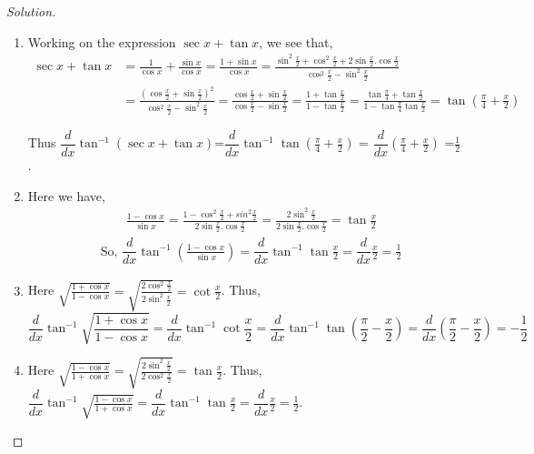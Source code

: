 \documentclass[../../main.tex]{subfiles}
\theoremstyle{definition}
\newenvironment{solution}
    {\begin{proof}[Solution]}
    {\end{proof}}
\begin{document}
\begin{solution}
\begin{enumerate}[label=(\roman*)]
\item Working on the expression $\sec x+\tan x$, we see that,
\begin{align*}
    \sec x+\tan x &= \frac{1}{\cos x}+\frac{\sin x}{\cos x} = \frac{1+\sin x}{\cos x} = \frac{\sin^2 \frac{x}{2}+\cos^2\frac{x}{2}+2\sin \frac{x}{2}.\cos \frac{x}{2}}{\cos^2 \frac{x}{2}-\sin^2 \frac{x}{2}} \\
    &= \frac{(\cos \frac{x}{2}+\sin \frac{x}{2})^2}{\cos^2 \frac{x}{2}-\sin^2 \frac{x}{2}} = \frac{\cos \frac{x}{2}+\sin \frac{x}{2}}{\cos \frac{x}{2}-\sin \frac{x}{2}} = \frac{1+\tan \frac{x}{2}}{1-\tan \frac{x}{2}} = \frac{\tan \frac{\pi}{4}+\tan \frac{x}{2}}{1-\tan \frac{\pi}{4}\tan \frac{x}{2}} = \tan \left(\frac{\pi}{4}+\frac{x}{2}\right)
\end{align*}

Thus $\dfrac{d}{dx} \tan ^{-1} (\sec x+\tan x)$=$\dfrac{d}{dx} \tan ^{-1} \tan \left(\frac{\pi}{4}+\frac{x}{2}\right)$ = $\dfrac{d}{dx} (\frac{\pi}{4}+\frac{x}{2})$ =$\frac{1}{2}$.


\item Here we have, 
\begin{align*}
&\qquad \frac{1-\cos x}{\sin x} = \frac{1-\cos^2\frac{x}{2}+sin^2\frac{x}{2}}{2\sin \frac{x}{2}.\cos \frac{x}{2}} = \frac{2\sin^2\frac{x}{2}}{2\sin \frac{x}{2}.\cos \frac{x}{2}} = \tan \frac{x}{2} \\ 
&\text{So, }\dfrac{d}{dx} \tan ^{-1} \left(\frac{1-\cos x}{\sin x}\right) = \dfrac{d}{dx} \tan ^{-1}\tan \frac{x}{2} = \dfrac{d}{dx}\frac{x}{2} = \frac{1}{2}
\end{align*}

\item Here $\sqrt{\frac{1+\cos x}{1-\cos x}} = \sqrt{\frac{2\cos^2\frac{x}{2}}{2\sin^2\frac{x}{2}}} = \cot \frac{x}{2}$. Thus,
\[
\dfrac{d}{dx} \tan ^{-1} \sqrt{\frac{1+\cos x}{1-\cos x}} = \dfrac{d}{dx} \tan ^{-1} \cot \frac{x}{2} = \dfrac{d}{dx} \tan ^{-1} \tan(\frac{\pi}{2}-\frac{x}{2}) = \dfrac{d}{dx}\left(\frac{\pi}{2}-\frac{x}{2}\right) = -\frac{1}{2}
\]

\item Here $\sqrt{\frac{1-\cos x}{1+\cos x}} = \sqrt{\frac{2\sin^2\frac{x}{2}}{2\cos^2\frac{x}{2}}} = \tan \frac{x}{2}$. Thus, $\dfrac{d}{dx} \tan ^{-1} \sqrt{\frac{1-\cos x}{1+\cos x}} = \dfrac{d}{dx} \tan ^{-1}\tan \frac{x}{2} = \dfrac{d}{dx}\frac{x}{2} = \frac{1}{2}$.


\end{enumerate}
\end{solution}
\end{document}
